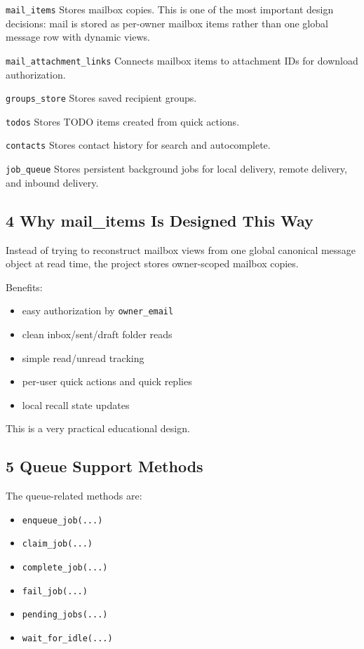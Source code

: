 \documentclass[11pt,a4paper]{article}
\begin{document}
\nolinkurl{mail_items} Stores mailbox copies. This is one of the most important design decisions: mail is stored as per-owner mailbox items rather than one global message row with dynamic views.

\nolinkurl{mail_attachment_links} Connects mailbox items to attachment IDs for download authorization.

\nolinkurl{groups_store} Stores saved recipient groups.

\nolinkurl{todos} Stores TODO items created from quick actions.

\nolinkurl{contacts} Stores contact history for search and autocomplete.

\nolinkurl{job_queue} Stores persistent background jobs for local delivery, remote delivery, and inbound delivery.

\subsection{4 Why mail\_items Is Designed This Way}

Instead of trying to reconstruct mailbox views from one global canonical message object at read time, the project stores owner-scoped mailbox copies.

Benefits:

\begin{itemize}
\item easy authorization by \nolinkurl{owner_email}
\item clean inbox/sent/draft folder reads
\item simple read/unread tracking
\item per-user quick actions and quick replies
\item local recall state updates
\end{itemize}

This is a very practical educational design.

\subsection{5 Queue Support Methods}

The queue-related methods are:

\begin{itemize}
\item \nolinkurl{enqueue_job(...)}
\item \nolinkurl{claim_job(...)}
\item \nolinkurl{complete_job(...)}
\item \nolinkurl{fail_job(...)}
\item \nolinkurl{pending_jobs(...)}
\item \nolinkurl{wait_for_idle(...)}
\end{itemize}
\end{document}
